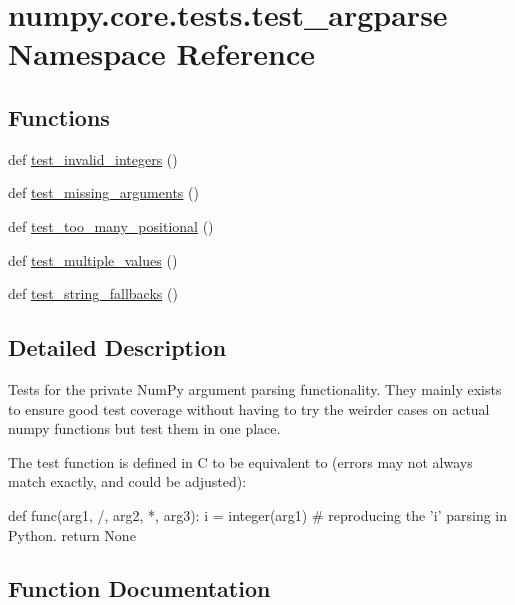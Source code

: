 \hypertarget{namespacenumpy_1_1core_1_1tests_1_1test__argparse}{}\section{numpy.\+core.\+tests.\+test\+\_\+argparse Namespace Reference}
\label{namespacenumpy_1_1core_1_1tests_1_1test__argparse}
\subsection*{Functions}
\begin{DoxyCompactItemize}
\item 
def \hyperlink{namespacenumpy_1_1core_1_1tests_1_1test__argparse_acfb301729719f948aea01b2b016cfa4d}{test\+\_\+invalid\+\_\+integers} ()
\item 
def \hyperlink{namespacenumpy_1_1core_1_1tests_1_1test__argparse_a6492e4961765f3c793ea633df0e77b44}{test\+\_\+missing\+\_\+arguments} ()
\item 
def \hyperlink{namespacenumpy_1_1core_1_1tests_1_1test__argparse_aa2abf4273e7876b243cd06fe8fb8699b}{test\+\_\+too\+\_\+many\+\_\+positional} ()
\item 
def \hyperlink{namespacenumpy_1_1core_1_1tests_1_1test__argparse_a3c64c4cc920e85fbfc50f80237f91cb6}{test\+\_\+multiple\+\_\+values} ()
\item 
def \hyperlink{namespacenumpy_1_1core_1_1tests_1_1test__argparse_a07522f4f20cb4397b963a55edcb6f28c}{test\+\_\+string\+\_\+fallbacks} ()
\end{DoxyCompactItemize}


\subsection{Detailed Description}
\begin{DoxyVerb}Tests for the private NumPy argument parsing functionality.
They mainly exists to ensure good test coverage without having to try the
weirder cases on actual numpy functions but test them in one place.

The test function is defined in C to be equivalent to (errors may not always
match exactly, and could be adjusted):

def func(arg1, /, arg2, *, arg3):
    i = integer(arg1)  # reproducing the 'i' parsing in Python.
    return None
\end{DoxyVerb}
 

\subsection{Function Documentation}
\mbox{\label{namespacenumpy_1_1core_1_1tests_1_1test__argparse_acfb301729719f948aea01b2b016cfa4d}} 
